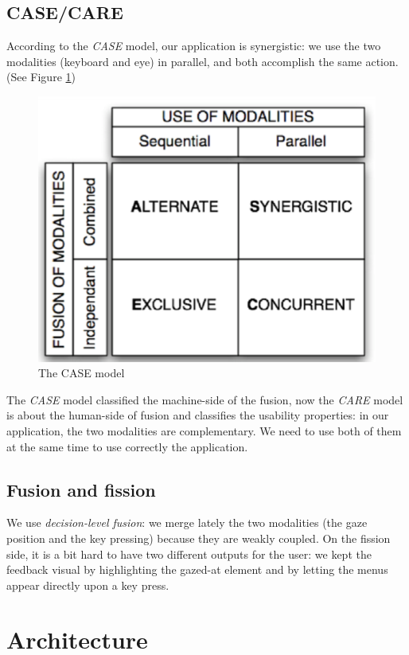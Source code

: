 \documentclass[12pt, a4paper]{article}
\begin{document}
\subsection{CASE/CARE}
According to the \textit{CASE} model, our application is synergistic: we use the two modalities (keyboard and eye) in parallel, and both accomplish the same action. (See Figure \ref{case-model})
\begin{figure}\centering
\includegraphics[scale=0.9]{casecare}
\caption{The CASE model}
\label{case-model}
\end{figure}
\newline
The \textit{CASE} model classified the machine-side of the fusion, now the \textit{CARE} model is about the human-side of fusion and classifies the usability properties: in our application, the two modalities are complementary. We need to use both of them at the same time to use correctly the application. 

\subsection{Fusion and fission}
We use \textit{decision-level fusion}: we merge lately the two modalities (the gaze position and the key pressing) because they are weakly coupled. On the fission side, it is a bit hard to have two different outputs for the user: we kept the feedback visual by highlighting the gazed-at element and by letting the menus appear directly upon a key press.  

\section{Architecture}
\end{document}
